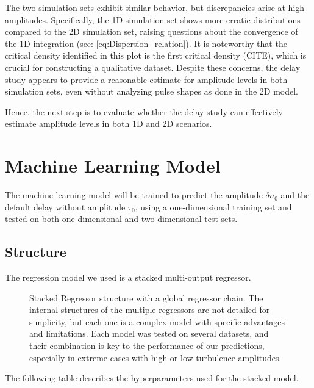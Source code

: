 \documentclass[11pt,a4paper,openany]{report}
\begin{document}
\begin{multicols}{2}
    The two simulation sets exhibit similar behavior, but discrepancies arise at high amplitudes. Specifically, the 1D simulation set shows more erratic distributions compared to the 2D simulation set, raising questions about the convergence of the 1D integration (see: \ref{eq:Dispersion_relation}). It is noteworthy that the critical density identified in this plot is the first critical density (CITE), which is crucial for constructing a qualitative dataset. Despite these concerns, the delay study appears to provide a reasonable estimate for amplitude levels in both simulation sets, even without analyzing pulse shapes as done in the 2D model.

    Hence, the next step is to evaluate whether the delay study can effectively estimate amplitude levels in both 1D and 2D scenarios.

    \section{Machine Learning Model}

    The machine learning model will be trained to predict the amplitude $\delta n_0$ and the default delay without amplitude $\tau_0$, using a one-dimensional training set and tested on both one-dimensional and two-dimensional test sets.

    \subsection{Structure}

    The regression model we used is a stacked multi-output regressor.

    \begin{figure}[H]
        \def\svgwidth{\linewidth}
        \centering
        
        \caption{Stacked Regressor structure with a global regressor chain. The internal structures of the multiple regressors are not detailed for simplicity, but each one is a complex model with specific advantages and limitations. Each model was tested on several datasets, and their combination is key to the performance of our predictions, especially in extreme cases with high or low turbulence amplitudes.}
    \end{figure}


    The following table describes the hyperparameters used for the stacked model.


\end{multicols}
\end{document}
